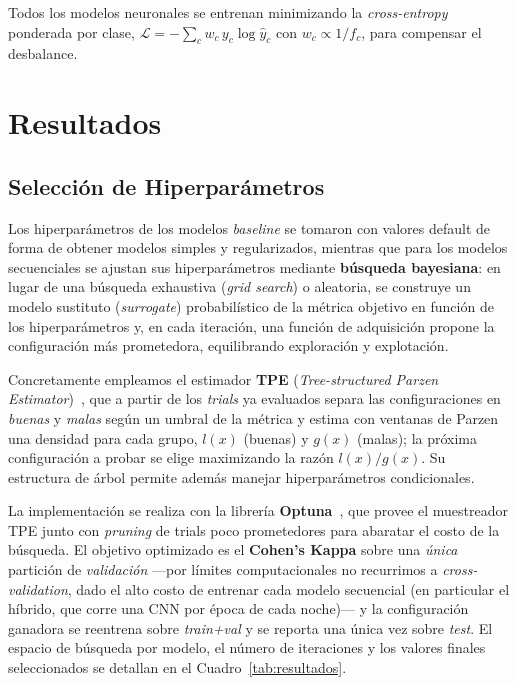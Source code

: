 \documentclass[conference]{IEEEtran}
\begin{document}
Todos los modelos neuronales se entrenan minimizando la \textit{cross-entropy} ponderada por clase, $\mathcal{L} = -\sum_c w_c\, y_c \log \hat{y}_c$ con $w_c \propto 1/f_c$, para compensar el desbalance.

\section{Resultados}

\subsection{Selección de Hiperparámetros}

Los hiperparámetros de los modelos \emph{baseline} se tomaron con valores default de forma de obtener modelos simples y regularizados, mientras que para los modelos secuenciales se ajustan sus hiperparámetros mediante \textbf{búsqueda bayesiana}: en lugar de una búsqueda exhaustiva (\textit{grid search}) o aleatoria, se construye un modelo sustituto (\emph{surrogate}) probabilístico de la métrica objetivo en función de los hiperparámetros y, en cada iteración, una función de adquisición propone la configuración más prometedora, equilibrando exploración y explotación.

Concretamente empleamos el estimador \textbf{TPE} (\emph{Tree-structured Parzen Estimator})~\cite{bergstra2011tpe}, que a partir de los \emph{trials} ya evaluados separa las configuraciones en \emph{buenas} y \emph{malas} según un umbral de la métrica y estima con ventanas de Parzen una densidad para cada grupo, $l(x)$ (buenas) y $g(x)$ (malas); la próxima configuración a probar se elige maximizando la razón $l(x)/g(x)$. Su estructura de árbol permite además manejar hiperparámetros condicionales.

La implementación se realiza con la librería \textbf{Optuna}~\cite{akiba2019optuna}, que provee el muestreador TPE junto con \emph{pruning} de trials poco prometedores para abaratar el costo de la búsqueda. El objetivo optimizado es el \textbf{Cohen's Kappa} sobre una \emph{única} partición de \emph{validación} ---por límites computacionales no recurrimos a \emph{cross-validation}, dado el alto costo de entrenar cada modelo secuencial (en particular el híbrido, que corre una CNN por época de cada noche)--- y la configuración ganadora se reentrena sobre \emph{train+val} y se reporta una única vez sobre \emph{test}. El espacio de búsqueda por modelo, el número de iteraciones y los valores finales seleccionados se detallan en el Cuadro~\ref{tab:resultados}.
\end{document}
